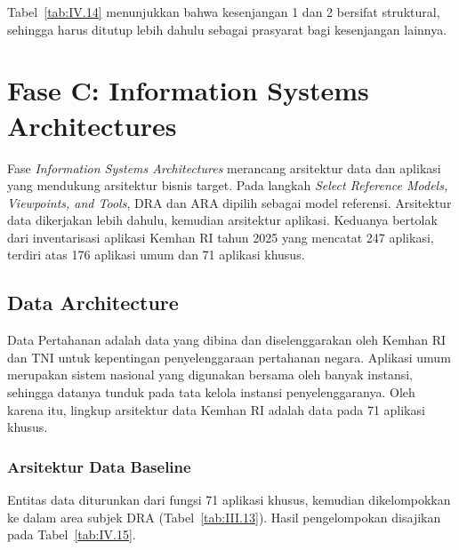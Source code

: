Tabel~\ref{tab:IV.14} menunjukkan bahwa kesenjangan 1 dan 2 bersifat struktural, sehingga harus ditutup lebih dahulu sebagai prasyarat bagi kesenjangan lainnya.

\section{Fase C: Information Systems Architectures}
\label{sec:IV.5}

Fase \textit{Information Systems Architectures} merancang arsitektur data dan aplikasi yang mendukung arsitektur bisnis target. Pada langkah \textit{Select Reference Models, Viewpoints, and Tools}, DRA dan ARA dipilih sebagai model referensi. Arsitektur data dikerjakan lebih dahulu, kemudian arsitektur aplikasi. Keduanya bertolak dari inventarisasi aplikasi Kemhan RI tahun 2025 yang mencatat 247 aplikasi, terdiri atas 176 aplikasi umum dan 71 aplikasi khusus.

\subsection{Data Architecture}
\label{sec:IV.5.1}

Data Pertahanan adalah data yang dibina dan diselenggarakan oleh Kemhan RI dan TNI untuk kepentingan penyelenggaraan pertahanan negara. Aplikasi umum merupakan sistem nasional yang digunakan bersama oleh banyak instansi, sehingga datanya tunduk pada tata kelola instansi penyelenggaranya. Oleh karena itu, lingkup arsitektur data Kemhan RI adalah data pada 71 aplikasi khusus.

\subsubsection{Arsitektur Data Baseline}
\label{sec:IV.5.1.1}

Entitas data diturunkan dari fungsi 71 aplikasi khusus, kemudian dikelompokkan ke dalam area subjek DRA (Tabel~\ref{tab:III.13}). Hasil pengelompokan disajikan pada Tabel~\ref{tab:IV.15}.

